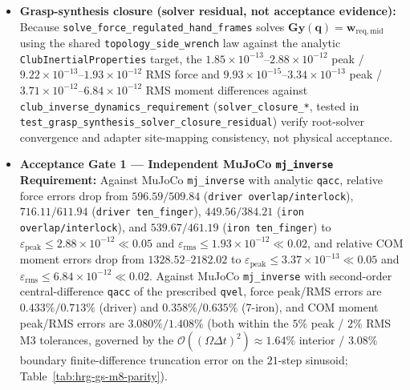 \documentclass[11pt,a4paper]{article}
\begin{document}
\begin{itemize}
  \item \textbf{Grasp-synthesis closure (solver residual, not acceptance evidence):} Because \texttt{solve\_force\_regulated\_hand\_frames} solves $\mathbf{G}\mathbf{y}(\mathbf{q}) = \mathbf{w}_{\mathrm{req,mid}}$ using the shared \texttt{topology\_side\_wrench} law against the analytic \texttt{ClubInertialProperties} target, the $1.85 \times 10^{-13}$--$2.88 \times 10^{-12}$ peak / $9.22 \times 10^{-13}$--$1.93 \times 10^{-12}$ RMS force and $9.93 \times 10^{-15}$--$3.34 \times 10^{-13}$ peak / $3.71 \times 10^{-12}$--$6.84 \times 10^{-12}$ RMS moment differences against \texttt{club\_inverse\_dynamics\_requirement} (\texttt{solver\_closure\_*}, tested in \texttt{test\_grasp\_synthesis\_solver\_closure\_residual}) verify root-solver convergence and adapter site-mapping consistency, not physical acceptance.
  \item \textbf{Acceptance Gate 1 --- Independent MuJoCo \texttt{mj\_inverse} Requirement:} Against MuJoCo \texttt{mj\_inverse} with analytic \texttt{qacc}, relative force errors drop from $596.59 / 509.84$ (\texttt{driver overlap/interlock}), $716.11 / 611.94$ (\texttt{driver ten\_finger}), $449.56 / 384.21$ (\texttt{iron overlap/interlock}), and $539.67 / 461.19$ (\texttt{iron ten\_finger}) to $\varepsilon_{\mathrm{peak}} \le 2.88 \times 10^{-12} \ll 0.05$ and $\varepsilon_{\mathrm{rms}} \le 1.93 \times 10^{-12} \ll 0.02$, and relative COM moment errors drop from $1328.52$--$2182.02$ to $\varepsilon_{\mathrm{peak}} \le 3.37 \times 10^{-13} \ll 0.05$ and $\varepsilon_{\mathrm{rms}} \le 6.84 \times 10^{-12} \ll 0.02$. Against MuJoCo \texttt{mj\_inverse} with second-order central-difference \texttt{qacc} of the prescribed \texttt{qvel}, force peak/RMS errors are $0.433\% / 0.713\%$ (driver) and $0.358\% / 0.635\%$ (7-iron), and COM moment peak/RMS errors are $3.080\% / 1.408\%$ (both within the $5\%$ peak / $2\%$ RMS M3 tolerances, governed by the $\mathcal{O}((\Omega\Delta t)^2) \approx 1.64\%$ interior / $3.08\%$ boundary finite-difference truncation error on the $21$-step sinusoid; Table~\ref{tab:hrg-gs-m8-parity}).

\end{itemize}
\end{document}
